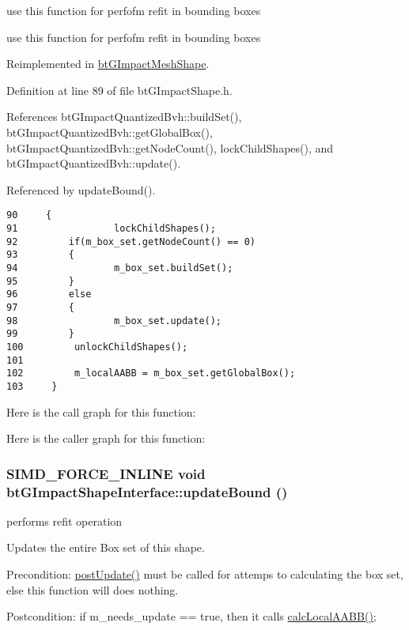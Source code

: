 use this function for perfofm refit in bounding boxes 

use this function for perfofm refit in bounding boxes 

Reimplemented in \hyperlink{classbt_g_impact_mesh_shape_a9273d609f4872c7a4c05e9873edbda8}{btGImpactMeshShape}.

Definition at line 89 of file btGImpactShape.h.

References btGImpactQuantizedBvh::buildSet(), btGImpactQuantizedBvh::getGlobalBox(), btGImpactQuantizedBvh::getNodeCount(), lockChildShapes(), and btGImpactQuantizedBvh::update().

Referenced by updateBound().

\begin{Code}\begin{verbatim}90     {
91                 lockChildShapes();
92         if(m_box_set.getNodeCount() == 0)
93         {
94                 m_box_set.buildSet();
95         }
96         else
97         {
98                 m_box_set.update();
99         }
100         unlockChildShapes();
101 
102         m_localAABB = m_box_set.getGlobalBox();
103     }
\end{verbatim}
\end{Code}




Here is the call graph for this function:

Here is the caller graph for this function:\hypertarget{classbt_g_impact_shape_interface_cb26c2d7a2aecabd06b996b72b848492}{
\subsubsection[updateBound]{\setlength{\rightskip}{0pt plus 5cm}SIMD\_\-FORCE\_\-INLINE void btGImpactShapeInterface::updateBound ()}}
\label{classbt_g_impact_shape_interface_cb26c2d7a2aecabd06b996b72b848492}


performs refit operation 

Updates the entire Box set of this shape. \begin{Desc}
\item[Precondition:]\hyperlink{classbt_g_impact_shape_interface_c430754948ac92d6f70b81e88416c96a}{postUpdate()} must be called for attemps to calculating the box set, else this function will does nothing. \end{Desc}
\begin{Desc}
\item[Postcondition:]if m\_\-needs\_\-update == true, then it calls \hyperlink{classbt_g_impact_shape_interface_1712a4613e20aa9249514dcd97f0a086}{calcLocalAABB()}; \end{Desc}


